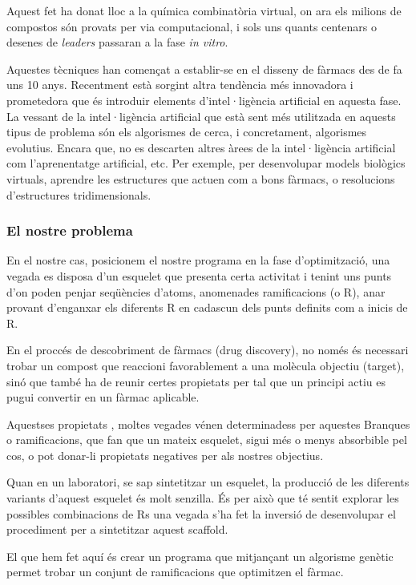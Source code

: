 \documentclass[titlepage,a4paper,12pt]{book}
\begin{document}
	Aquest fet ha donat lloc a la química combinatòria virtual, on ara els
	milions de compostos són provats per via computacional, i sols uns quants
	centenars o desenes de \emph{leaders} passaran a la fase \emph{in vitro}.

	Aquestes tècniques han començat a establir-se en el disseny de fàrmacs des
	de fa uns 10 anys. Recentment està sorgint altra tendència més innovadora i
	prometedora que és introduir elements d'intel·ligència artificial en aquesta
	fase. La vessant de la intel·ligència artificial que està sent més
	utilitzada en aquests tipus de problema són els algorismes de cerca, i
	concretament, algorismes evolutius. Encara que, no es descarten altres àrees
	de la intel·ligència artificial com l'aprenentatge artificial, etc.  Per
	exemple, per desenvolupar models biològics virtuals, aprendre les
	estructures que actuen com a bons fàrmacs, o resolucions d'estructures
	tridimensionals. 

\subsubsection{El nostre problema} %

	En el nostre cas, posicionem el nostre programa en la fase d'optimització,
	una vegada es disposa d'un esquelet que presenta certa activitat i tenint
	uns punts d'on poden penjar seqüències d'atoms, anomenades ramificacions (o
	R), anar provant d'enganxar els diferents R en cadascun dels punts definits
	com a inicis de R.

	En el proccés de descobriment de fàrmacs (drug discovery), no només és
	necessari trobar un compost que reaccioni favorablement a una molècula
	objectiu (target), sinó que també ha de reunir certes propietats per tal que
	un principi actiu es pugui convertir en un fàrmac aplicable.  	

	Aquestses propietats , moltes vegades vénen determinadess per aquestes
	Branques o ramificacions, que fan que un mateix esquelet, sigui més o menys
	absorbible pel cos, o pot donar-li propietats negatives per als nostres
	objectius.

	Quan en un laboratori, se sap sintetitzar un esquelet, la producció de les
	diferents variants d'aquest esquelet és molt senzilla.  És per això que té
	sentit explorar les possibles combinacions de Rs una vegada s'ha fet la
	inversió de desenvolupar el procediment per a sintetitzar aquest scaffold.

	El que hem fet aquí és crear un programa que mitjançant un algorisme
	genètic permet trobar un conjunt de ramificacions que optimitzen el fàrmac.
\end{document}
